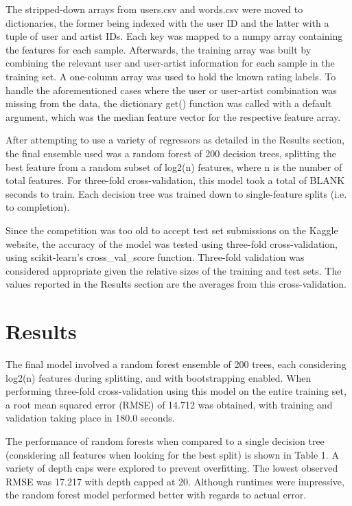 \documentclass[11pt]{article}
\begin{document}
	The stripped-down arrays from users.csv and words.csv were moved to
	dictionaries, the former being indexed with the user ID and the latter
	with a tuple of user and artist IDs. Each key was mapped to a numpy
	array containing the features for each sample. Afterwards, the training
	array was built by combining the relevant user and user-artist
	information for each sample in the training set. A one-column array
	was used to hold the known rating labels. To handle the aforementioned 
	cases where
	the user or user-artist combination was missing from the data, the
	dictionary get() function was called with a default argument, which was
	the median feature vector for the respective feature array.
	
	After attempting to use a variety of regressors as detailed in the
	Results section, the final ensemble used was a random forest of 200
	decision trees, splitting the best feature from a random subset of
	log2(n) features, where n is
	the number of total features. For three-fold cross-validation, this
	model took a total of BLANK seconds to train. Each decision tree was
	trained down to single-feature splits (i.e. to completion). 
	
	Since the competition was too old to accept test set submissions on
	the Kaggle website, the accuracy of the model was tested using three-fold
	cross-validation, using scikit-learn's cross\_val\_score function. 
	Three-fold validation was considered appropriate given the relative
	sizes of the training and test sets. The
	values reported in the Results section are the averages from this
	cross-validation. 
	
	\section{Results}
	
	The final model involved a random forest ensemble of 200 trees, each considering
	log2(n) features during splitting, and with bootstrapping enabled. When performing
	three-fold cross-validation using this model on the entire training
	set, a root mean squared error (RMSE) of 14.712 was obtained, with training and validation
	taking place in 180.0 seconds.
	
	The performance of random forests when compared to a single decision tree
	(considering all features when looking for the best split) is shown in
	Table 1. A variety of depth caps were explored to prevent overfitting.
	The lowest observed RMSE was 17.217 with depth capped at 20. Although
	runtimes were impressive, the random forest model performed better
	with regards to actual error.
	
\end{document}
